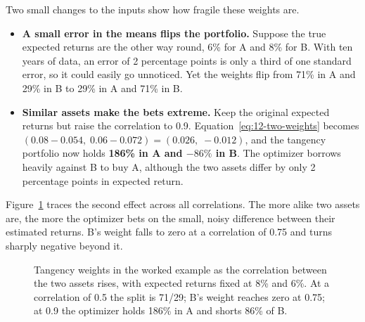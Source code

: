 Two small changes to the inputs show how fragile these weights are.
\begin{itemize}
  \item \textbf{A small error in the means flips the portfolio.} Suppose the true expected returns are the other way round, 6\% for A and 8\% for B. With ten years of data, an error of 2 percentage points is only a third of one standard error, so it could easily go unnoticed. Yet the weights flip from 71\% in A and 29\% in B to 29\% in A and 71\% in B.
  \item \textbf{Similar assets make the bets extreme.} Keep the original expected returns but raise the correlation to 0.9. Equation~\eqref{eq:12-two-weights} becomes $(0.08 - 0.054,\; 0.06 - 0.072) = (0.026,\; -0.012)$, and the tangency portfolio now holds \textbf{186\% in A and $-86\%$ in B}. The optimizer borrows heavily against B to buy A, although the two assets differ by only 2 percentage points in expected return.
\end{itemize}

Figure~\ref{fig:12-weights} traces the second effect across all correlations. The more alike two assets are, the more the optimizer bets on the small, noisy difference between their estimated returns. B's weight falls to zero at a correlation of 0.75 and turns sharply negative beyond it.

\begin{figure}[htbp]
\centering
{}
\caption{Tangency weights in the worked example as the correlation between the two assets rises, with expected returns fixed at 8\% and 6\%. At a correlation of 0.5 the split is 71/29; B's weight reaches zero at 0.75; at 0.9 the optimizer holds 186\% in A and shorts 86\% of B.}
\label{fig:12-weights}
\end{figure}

